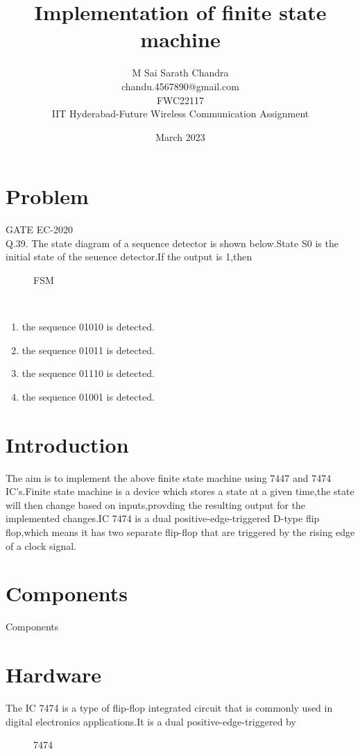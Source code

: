 \documentclass{article}
\title{Implementation of finite state machine}
\date{March 2023}
\author{M Sai Sarath Chandra\\chandu.4567890@gmail.com\\FWC22117\\IIT Hyderabad-Future Wireless Communication Assignment}
\begin{document}
\maketitle
	\tableofcontents

\pagebreak
\section{Problem}
	{GATE EC-2020}\\
	Q.39. The state diagram of a sequence detector is shown below.State S0 is the initial state of the seuence detector.If the output is 1,then 
\\
\begin{figure}[h]
	\centering

	\caption{FSM}
	\label{fig:1}
\end{figure}
\\
\begin{enumerate}
	\item the sequence 01010 is detected.
	\item the sequence 01011 is detected.
	\item the sequence 01110 is detected.
	\item the sequence 01001 is detected.
\end{enumerate}

\section{Introduction}
		The aim is to implement the above finite state machine using 7447 and 7474 IC's.Finite state machine is a device which stores a state at a given time,the state will then change based on inputs,provding the resulting output for the implemented changes.IC 7474 is a dual positive-edge-triggered D-type flip flop,which means it has two separate flip-flop that are triggered by the rising edge of a clock signal.

\section{Components}
	\begin{table}[h]
		\begin{center}
			
			\caption{Components}
			\label{table:1}
		\end{center}
	\end{table}
\pagebreak

\section{Hardware}
	The IC 7474 is a type of flip-flop integrated circuit that is commonly used in digital electronics applications.It is a dual positive-edge-triggered by
	\begin{figure}[h]
		\centering
		
			\caption{7474}
			\label{fig:2}
		\end{figure}
\end{document}
